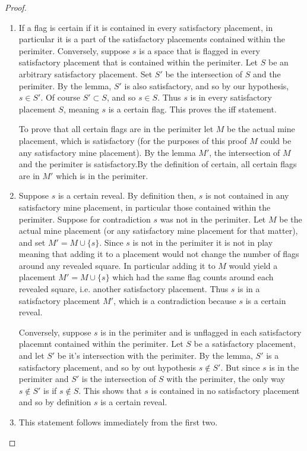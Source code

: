 \documentclass{article}
\theoremstyle{definition}
\theoremstyle{definition}
\theoremstyle{theorem}
\begin{document}
	\begin{proof}
	\begin{enumerate}
		\item
		If a flag is certain if it is contained in every satisfactory placement, in particular it is a part of the satisfactory placements contained within the perimiter. Conversely, suppose $s$ is a space that is flagged in every satisfactory placement that is contained within the perimiter. Let $S$ be an arbitrary satisfactory placement. Set $S'$ be the intersection of $S$ and the perimiter. By the lemma, $S'$ is also satisfactory, and so by our hypothesis,  $s \in S'$. Of course $S' \subset S$, and so $s \in S$. Thus $s$ is in every satisfactory placement $S$, meaning $s$ is a certain flag. This proves the iff statement. 
		
		To prove that all certain flags are in the perimiter let $M$ be the actual mine placement, which is satisfactory (for the purposes of this proof $M$ could be any satisfactory mine placement). By the lemma $M'$, the intersection of $M$ and the perimiter is satisfactory.By the definition of certain, all certain flags are in $M'$ which is  in the perimiter.
		
		\item
		Suppose $s$ is a certain reveal. By definition then, $s$ is not contained in any satisfactory mine placement, in particular those contained within the perimiter. Suppose for contradiction $s$ was not in the perimiter. Let $M$ be the actual mine placement (or any satisfactory mine placement for that matter), and set $M' = M \cup \{s\}$. Since $s$ is not in the perimiter it is not in play meaning that adding it to a placement would not change the number of flags around any revealed square. In particular adding it to $M$ would yield a placement $M' = M \cup \{s\}$ which had the same flag counts around each revealed square, i.e. another satisfactory placement. Thus $s$ is in a satisfactory placement $M'$, which is a contradiction because $s$ is a certain reveal.
		
		Conversely, suppose $s$ is in the perimiter and is unflagged in each satisfactory placemnt contained within the perimiter. Let $S$ be a satisfactory placement, and let $S'$ be it's intersection with the perimiter. By the lemma, $S'$ is a satisfactory placement, and so by out hypothesis $s \notin S'$. But since  $s$ is in the perimiter and $S'$ is the intersection of $S$ with the perimiter, the only way $s \notin S'$ is if $s \notin S$. This shows that $s$ is contained in no satisfactory placement and so by definition $s$ is a certain reveal.
		
		\item
		This statement follows immediately from the first two.
		
		
	\end{enumerate}
	\end{proof}
\end{document}
